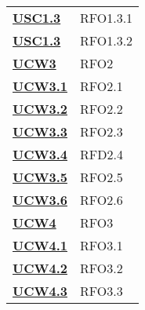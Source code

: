 \begin{longtable}[H]{| >{\centering\bfseries}p{8cm} | >{\centering\arraybackslash}p{8cm} |}
    \hyperref[par:usc1.3]{USC1.3}  & RFO1.3.1                                                                  \\

    \hyperref[par:usc1.3]{USC1.3}  & RFO1.3.2                                                                  \\


    \hyperref[sub:ucw2]{UCW3}          & RFO2                                                                      \\

    \hyperref[ssub:ucw3.1]{UCW3.1}     & RFO2.1                                                                    \\

    \hyperref[ssub:ucw3.2]{UCW3.2}     & RFO2.2                                                                    \\

    \hyperref[ssub:ucw3.3]{UCW3.3}     & RFO2.3                                                                    \\

    \hyperref[ssub:ucw3.4]{UCW3.4}     & RFD2.4                                                                    \\

    \hyperref[ssub:ucw3.5]{UCW3.5}     & RFO2.5                                                                    \\

    \hyperref[ssub:ucw3.6]{UCW3.6}     & RFO2.6                                                                    \\



    \hyperref[sub:ucw4]{UCW4}          & RFO3                                                                      \\

    \hyperref[ssub:ucw3.1]{UCW4.1}     & RFO3.1                                                                    \\

    \hyperref[ssub:ucw4.2]{UCW4.2}     & RFO3.2                                                                    \\

    \hyperref[ssub:ucw4.3]{UCW4.3}     & RFO3.3                                                                    \\





\end{longtable}
